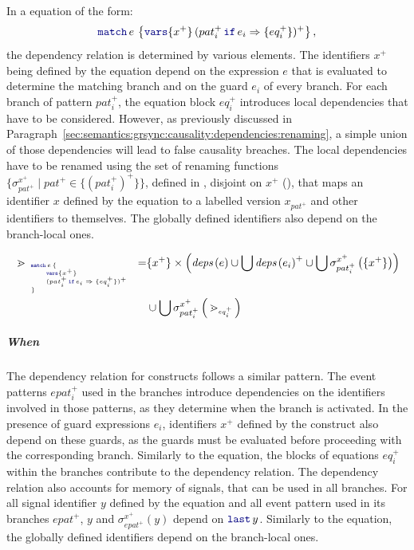 In a  equation of the form:
$$\match{e}{x^+}{(\branch{pat_i^+}{e_i}{eq_i^+})^+},$$
the dependency relation is determined by various elements.
%
The identifiers $x^+$ being defined by the  equation depend on the expression $e$ that
is evaluated to determine the matching branch and on the guard $e_i$ of every branch.
%
For each branch of pattern $pat_i^+$, the equation block $eq_i^+$ introduces local dependencies that
have to be considered. However, as previously discussed in Paragraph~\ref{sec:semantics:grsync:causality:dependencies:renaming},
a simple union of those dependencies will lead to false causality breaches. The local dependencies
have to be renamed using the set of renaming functions
$\{\sigma^{x^+}_{pat^+} \mid pat^+ \in \{(pat_i^+)^+\}\}$, defined in
, disjoint on $x^+$
(), that maps an identifier $x$ defined by the
 equation to a labelled version $x_{pat^+}$ and other identifiers to themselves.
%
The globally defined identifiers also depend on the branch-local ones.

\begin{equation}
    \begin{split}
        \depRel{\matchTab{e}{x^+}{(\branch{pat_i^+}{e_i}{eq_i^+})^+}}{}{} =
         & \{x^+\} \times \left( \deps{e}
        \cup \bigcup \deps{e_i}^+
        \cup \bigcup \sigma^{x^+}_{pat_i^+}\left(\{x^+\}\right)\right)         \\
         & \cup \bigcup \sigma^{x^+}_{pat_i^+}\left(\depRel{eq_i^+}{}{}\right)
    \end{split}
    \label{rule:semantics:grsync:causality:dependencies:rel:eq:match}
\end{equation}

\subparagraph{When}

The dependency relation for  constructs follows a similar pattern.
%
The event patterns $epat_i^+$ used in the branches introduce dependencies on the
identifiers involved in those patterns, as they determine when the branch is activated. In the
presence of guard expressions $e_i$, identifiers $x^+$ defined by the  construct also
depend on these guards, as the guards must be evaluated before proceeding with the corresponding
branch.
%
Similarly to the  equation, the blocks of equations $eq_i^+$ within the branches
contribute to the dependency relation.
%
The dependency relation also accounts for memory of signals, that can be used in all branches. For
all signal identifier $y$ defined by the  equation and all event pattern used in its
branches $epat^+$, $y$ and $\sigma^{x^+}_{epat^+}(y)$ depend on $\last{y}$.
%
Similarly to the  equation, the globally defined identifiers depend on the branch-local ones.

